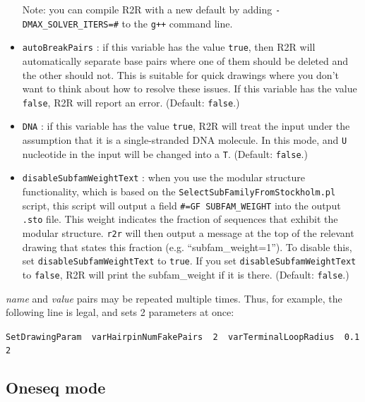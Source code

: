\documentclass[letterpaper,12pt]{report}
\begin{document}
\begin{itemize}
Note: you can compile R2R with a new default by adding {\tt -DMAX\_SOLVER\_ITERS=\#} to the {\tt g++} command
line.
\item {\tt autoBreakPairs} : if this variable has the value {\tt true}, then R2R will automatically 
separate base pairs where one of them should be deleted and the other should not.
This is suitable for quick drawings where you don't want to think about how to resolve these issues.
If this variable has the value {\tt false}, R2R will report an error. (Default: {\tt false}.)
\item {\tt DNA} : if this variable has the value {\tt true}, R2R will treat the input under the assumption that it is a single-stranded DNA molecule.  In this mode, and {\tt U} nucleotide in the input will be changed into a {\tt T}.  (Default: {\tt false}.)
\item {\tt disableSubfamWeightText} : when you use the modular structure functionality, which is based on the {\tt SelectSubFamilyFromStockholm.pl} script, this script will output a field {\tt \#=GF SUBFAM\_WEIGHT} into the output {\tt .sto} file.  This weight indicates the fraction of sequences that exhibit the modular structure.  {\tt r2r} will then output a message at the top of the relevant drawing that states this fraction (e.g. ``subfam\_weight=1'').  To disable this, set {\tt disableSubfamWeightText} to {\tt true}.  If you set {\tt disableSubfamWeightText} to {\tt false}, R2R will print the subfam\_weight if it is there.  (Default: {\tt false}.)
\end{itemize}

\textit{name }and \textit{value }pairs may be repeated multiple times. 
Thus, for example, the following line is legal, and sets 2 parameters
at once:

{\tt SetDrawingParam\ \ varHairpinNumFakePairs\ \ 2\ \ varTerminalLoopRadius\ \ 0.12}

\subsection{Oneseq mode}
\end{document}

